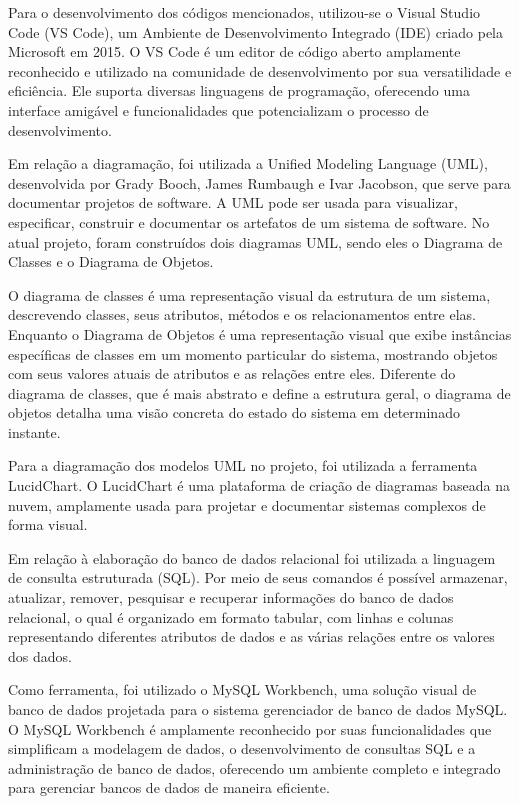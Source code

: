 Para o desenvolvimento dos códigos mencionados, utilizou-se o Visual Studio Code (VS Code), um Ambiente de Desenvolvimento Integrado (IDE) criado pela Microsoft em 2015. O VS Code é um editor de código aberto amplamente reconhecido e utilizado na comunidade de desenvolvimento por sua versatilidade e eficiência. Ele suporta diversas linguagens de programação, oferecendo uma interface amigável e funcionalidades que potencializam o processo de desenvolvimento. \textcite{Akira}

Em relação a diagramação, foi utilizada a Unified Modeling Language (UML), desenvolvida por Grady Booch, James Rumbaugh e Ivar Jacobson, que serve para documentar projetos de software. A UML pode ser usada para visualizar, especificar, construir e documentar os artefatos de um sistema de software. No atual projeto, foram construídos dois diagramas UML, sendo eles o Diagrama de Classes e o Diagrama de Objetos.

O diagrama de classes é uma representação visual da estrutura de um sistema, descrevendo classes, seus atributos, métodos e os relacionamentos entre elas. Enquanto o Diagrama de Objetos é uma representação visual que exibe instâncias específicas de classes em um momento particular do sistema, mostrando objetos com seus valores atuais de atributos e as relações entre eles. Diferente do diagrama de classes, que é mais abstrato e define a estrutura geral, o diagrama de objetos detalha uma visão concreta do estado do sistema em determinado instante.

Para a diagramação dos modelos UML no projeto, foi utilizada a ferramenta LucidChart. O LucidChart é uma plataforma de criação de diagramas baseada na nuvem, amplamente usada para projetar e documentar sistemas complexos de forma visual.

Em relação à elaboração do banco de dados relacional foi utilizada a linguagem de consulta estruturada (SQL). Por meio de seus comandos é possível armazenar, atualizar, remover, pesquisar e recuperar informações do banco de dados relacional, o qual é organizado em formato tabular, com linhas e colunas representando diferentes atributos de dados e as várias relações entre os valores dos dados. \textcite{Amazon}

Como ferramenta, foi utilizado o MySQL Workbench, uma solução visual de banco de dados projetada para o sistema gerenciador de banco de dados MySQL. O MySQL Workbench é amplamente reconhecido por suas funcionalidades que simplificam a modelagem de dados, o desenvolvimento de consultas SQL e a administração de banco de dados, oferecendo um ambiente completo e integrado para gerenciar bancos de dados de maneira eficiente.

